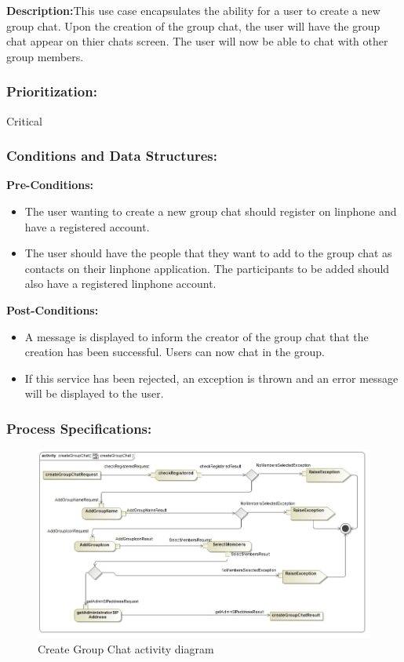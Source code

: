 \documentclass[a4paper]{article}
\begin{document}
\textbf{Description:}This use case encapsulates the ability for a user to create a new group chat. Upon the creation of the group chat, the user will have the group chat appear on thier chats screen. The user will now be able to chat with other group members.

\subsubsection{Prioritization:}Critical
\subsubsection{Conditions and Data Structures:}
\textbf{Pre-Conditions:}
\begin{itemize}
	\item The user wanting to create a new group chat should register on linphone and have a registered account.
	\item The user should have the people that they want to add to the group chat as contacts on their linphone application. 
		  The participants to be added should also have a registered linphone account.
\end{itemize}
\textbf{Post-Conditions:}
\begin{itemize}
	\item A message is displayed to inform the creator of the group chat that the creation has been successful. Users can now chat in the group.
	\item If this service has been rejected, an exception is thrown and an error message will be displayed to the user.
\end{itemize}
	
\subsubsection{Process Specifications:} 
\begin{figure}[H]
\includegraphics[width=1\linewidth]{./pictures/create_GroupChat.jpg}
\caption{Create Group Chat activity diagram }
\end{figure}
\end{document}
